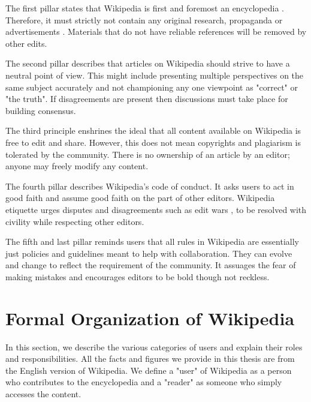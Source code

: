 The first pillar states that Wikipedia is first and foremost an encyclopedia \cite{wiki:wiki-is-not}. Therefore, it must strictly not contain any original research, propaganda or advertisements \cite{wiki:wiki-NOR}. Materials that do not have reliable references will be removed by other edits.

The second pillar describes that articles on Wikipedia should strive to have a neutral point of view. This might include presenting multiple perspectives on the same subject accurately and not championing any one viewpoint as "correct" or "the truth". If disagreements are present then discussions must take place for building consensus.

The third principle enshrines the ideal that all content available on Wikipedia is free to edit and share. However, this does not mean copyrights and plagiarism is tolerated by the community. There is no ownership of an article by an editor; anyone may freely modify any content.

The fourth pillar describes Wikipedia's code of conduct. It asks users to act in good faith and assume good faith on the part of other editors. Wikipedia etiquette urges disputes and disagreements such as edit wars \cite{wiki:edit-wars}, to be resolved with civility while respecting other editors.

The fifth and last pillar reminds users that all rules in Wikipedia are essentially just policies and guidelines meant to help with collaboration. They can evolve and change to reflect the requirement of the community. It assuages the fear of making mistakes and encourages editors to be bold though not reckless. 

\section{Formal Organization of Wikipedia}
\label{sec:formal-org-wikipedia}
In this section, we describe the various categories of users and explain their roles and responsibilities. All the facts and figures we provide in this thesis are from the English version of Wikipedia. We define a "user" of Wikipedia as a person who contributes to the encyclopedia and a "reader" as someone who simply accesses the content.

